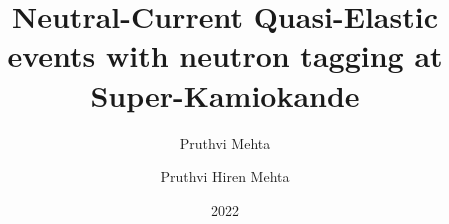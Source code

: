 \documentclass[11pt,twoside]{report}
\author{Pruthvi Mehta}
\date{2022}
\title{\textbf{Neutral-Current Quasi-Elastic events with neutron tagging at Super-Kamiokande}} \let\Title\@title
\author{Pruthvi Hiren Mehta} \let\Author\@author
\begin{document}
\pagestyle{empty}


\cleardoublepage



\pagestyle{fancy}

\cleardoublepage
\thispagestyle{empty}







\tableofcontents

\cleardoublepage
  

  
  
  
  
  
  
  
  
 

    
  


\begin{appendices}

\end{appendices}
\end{document}
